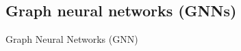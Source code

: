 \documentclass[aspectratio=169]{beamer}
\renewcommand{\alert}[1]{\textbf{\color{swufe}#1}}
\newcommand{\alertplain}[1]{{\color{swufe}#1}}
\begin{document}
    \subsection{Graph neural networks (GNNs)}
        \begin{frame}{Graph Neural Networks (GNN)}





\end{frame}
\end{document}
